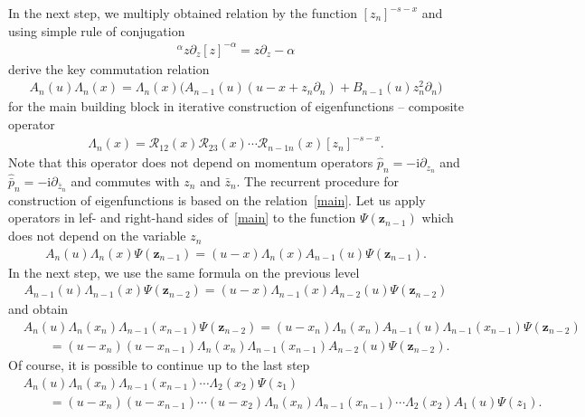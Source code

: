 \documentclass[10pt,a4paper]{amsart}
\renewcommand{\imath}{\mathrm{i}}
\numberwithin{equation}{section}
\begin{document}
In the next step, we multiply obtained relation by the function $[z_n]^{-s-x}$
and using simple rule of conjugation
\begin{align*}
[z]^{\alpha} z\partial_{z} [z]^{-\alpha} = z\partial_{z} -\alpha
\end{align*}
derive the key commutation relation
\begin{align}\label{main}
A_{n}(u) \Lambda_n( x) =
\Lambda_n( x) \bigl(A_{n-1}(u) (u-x+z_n \partial_n)
+ B_{n-1}(u) z_n^2 \partial_n \bigl)
\end{align}
for the main building block in iterative construction of eigenfunctions -- composite operator
\begin{align*}
\Lambda_n( x) = \mathcal{R}_{12}( x)\mathcal{R}_{23}( x)\cdots
\mathcal{R}_{n-1 n}( x) [z_n]^{-s-x} .
\end{align*}
Note that this operator does not depend on
momentum operators $\hat{p}_n = -\imath\partial_{z_n}$ and
$\hat{\bar{p}}_n = -\imath\partial_{\bar{z}_n}$ and commutes with $z_n$ and $\bar{z}_n$.
The recurrent procedure for construction of eigenfunctions
is based on the relation~\eqref{main}.
Let us apply operators in lef- and right-hand sides of~\eqref{main} to the function
$\Psi(\bm z_{n-1})$ which does not depend on the variable $z_n$
\begin{align*}
A_{n}(u) \Lambda_n( x)
\Psi(\bm z_{n-1}) =
(u-x) \Lambda_n( x)
A_{n-1}(u)\Psi(\bm z_{n-1}) .
\end{align*}
In the next step, we use the same formula on the previous level
\begin{align*}
A_{n-1}(u) \Lambda_{n-1}( x)
\Psi(\bm z_{n-2}) =
(u-x) \Lambda_{n-1}( x)
A_{n-2}(u)\Psi(\bm z_{n-2})
\end{align*}
and obtain
\begin{align*}
&A_{n}(u) \Lambda_n( x_n)\Lambda_{n-1}( x_{n-1})
\Psi(\bm z_{n-2})=
(u-x_n) \Lambda_n( x_n)
A_{n-1}(u) \Lambda_{n-1}( x_{n-1})\Psi(\bm z_{n-2}) \\
&\qquad =
(u-x_n) (u-x_{n-1}) \Lambda_n( x_n)
\Lambda_{n-1}( x_{n-1})
A_{n-2}(u) \Psi(\bm z_{n-2}).
\end{align*}
Of course, it is possible to continue up to the last step
\begin{align*}
&
A_{n}(u) \Lambda_n( x_n)
\Lambda_{n-1}( x_{n-1})\cdots
\Lambda_{2}( x_{2}) \Psi(z_1)
\\
& \qquad
= (u-x_n)(u-x_{n-1})\cdots(u-x_2)
\Lambda_n( x_n)
\Lambda_{n-1}( x_{n-1})\cdots
\Lambda_{2}( x_{2}) A_{1}(u) \Psi(z_1) .
\end{align*}
\end{document}
